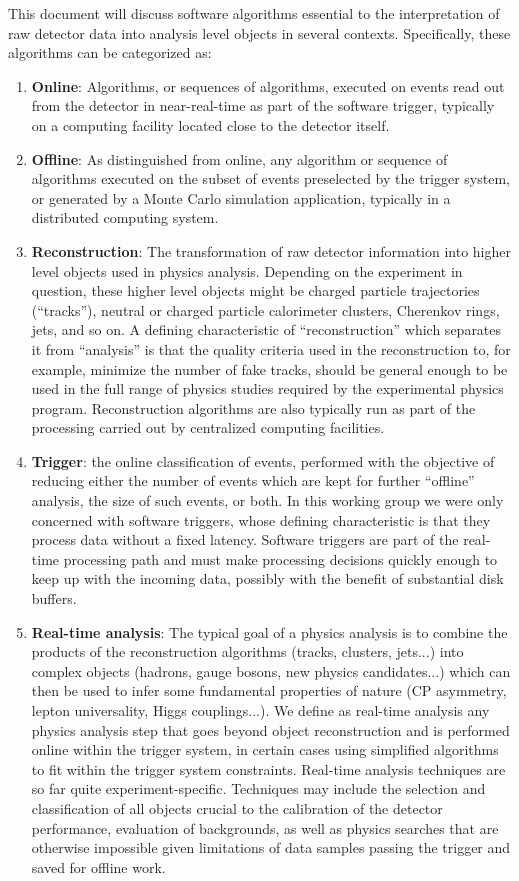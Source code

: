 This document will discuss software algorithms essential to the interpretation of raw detector data into analysis level objects in several contexts. 
Specifically, these algorithms can be categorized as: 
\begin{enumerate}
\item {\bf Online}: Algorithms, or sequences of algorithms, executed on events read out from the detector in near-real-time as part of the software trigger, typically 
on a computing facility located close to the detector itself.
\item {\bf Offline}: As distinguished from online, any algorithm or sequence of algorithms executed on the subset of events preselected by the trigger system, or generated 
by a Monte Carlo simulation application, typically in a distributed computing system.
\item
{\bf Reconstruction}: The transformation of raw detector information into higher level objects used in physics analysis. 
Depending on the experiment in question, these 
higher level objects might be charged particle trajectories (``tracks''), neutral or charged particle calorimeter clusters, Cherenkov rings, jets, and so on. 
 A defining characteristic of “reconstruction” which separates it from “analysis” is that the quality criteria used in the reconstruction to, for example, minimize the number of fake tracks, should be general enough to be used in the full range of physics studies required by the experimental physics program.
Reconstruction algorithms are also typically run as part of the processing carried out by centralized computing facilities.
\item
{\bf Trigger}: the online classification of events, performed with the objective of reducing either the number of events which are kept for further ``offline'' analysis, 
the size of such events, or both. In this working group we were only concerned with software triggers, whose defining characteristic is that they process data without a 
fixed latency. Software triggers are part of the real-time processing path and must make processing decisions quickly enough to keep up with the incoming data, possibly 
with the benefit of substantial disk buffers.
\item
{\bf Real-time analysis}: The typical goal of a physics analysis is to combine the products of the reconstruction algorithms (tracks, clusters, jets...) into complex 
objects (hadrons, gauge bosons, new physics candidates...) which can then be used to infer some fundamental properties of nature (CP asymmetry, lepton universality, Higgs couplings...). 
We define as real-time analysis any physics analysis step that goes beyond object reconstruction and is performed online within the trigger system, in certain cases 
using simplified algorithms to fit within the trigger system constraints. Real-time analysis techniques are so far quite experiment-specific. Techniques may include 
the selection and classification of all objects crucial to the calibration of the detector performance, evaluation of backgrounds, as well as physics searches that are 
otherwise impossible given limitations of data samples passing the trigger and saved for offline work.
\end{enumerate}

